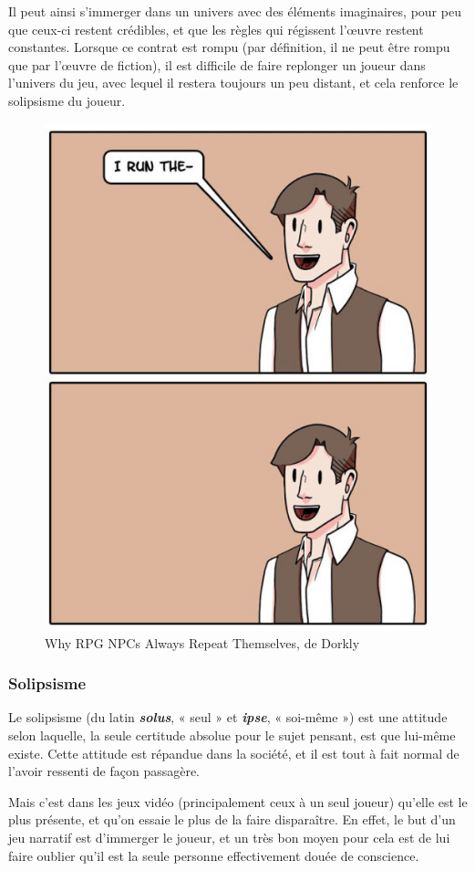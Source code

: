 \documentclass[a4paper, 12pt]{article} %
\begin{document}
Il peut ainsi s’immerger dans un univers avec des éléments imaginaires, pour peu que ceux-ci restent crédibles, et que les règles qui régissent l’œuvre restent constantes.
Lorsque ce contrat est rompu (par définition, il ne peut être rompu que par l’œuvre de fiction), il est difficile de faire replonger un joueur dans l’univers du jeu, avec lequel il restera toujours un peu distant, et cela renforce le solipsisme du joueur.

\begin{figure}[!h]%
	\begin{center} 
		\includegraphics[width=0.40\columnwidth]{images/repeat3.png}%
		\caption{Why RPG NPCs Always Repeat Themselves, de Dorkly}%
	\end{center}
\end{figure}

\newpage
\subsubsection{Solipsisme}

Le solipsisme\cite{solipsisme} (du latin \textbf{\textit{solus}}, « seul » et \textbf{\textit{ipse}}, « soi-même ») est une attitude selon laquelle, la seule certitude absolue pour le sujet pensant, est que lui-même existe. Cette attitude est répandue dans la société, et il est tout à fait normal de l’avoir ressenti de façon passagère.

Mais c'est dans les jeux vidéo (principalement ceux à un seul joueur) qu'elle est le plus présente, et qu’on essaie le plus de la faire disparaître. En effet, le but d’un jeu narratif est d’immerger le joueur, et un très bon moyen pour cela est de lui faire oublier qu’il est la seule personne effectivement douée de conscience.
\end{document}
